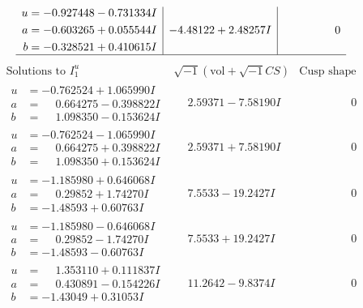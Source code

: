 \documentclass[1p]{elsarticle_modified}
\theoremstyle{definition}
\newcommand{\I}{\sqrt{-1}}
\begin{document}
$$\begin{array}{c|c|c}
\begin{aligned}
u &= -0.927448 - 0.731334 I \\
a &= -0.603265 + 0.055544 I \\
b &= -0.328521 + 0.410615 I\end{aligned}
 & -4.48122 + 2.48257 I & \phantom{-0.000000 } 0\\
 \hline 
 \end{array}$$\newpage$$\begin{array}{c|c|c}  
\text{Solutions to }I^u_{1}& \I (\text{vol} + \sqrt{-1}CS) & \text{Cusp shape}\\
 \hline 
\begin{aligned}
u &= -0.762524 + 1.065990 I \\
a &= \phantom{-}0.664275 - 0.398822 I \\
b &= \phantom{-}1.098350 - 0.153624 I\end{aligned}
 & \phantom{-}2.59371 - 7.58190 I & \phantom{-0.000000 } 0 \\ \hline\begin{aligned}
u &= -0.762524 - 1.065990 I \\
a &= \phantom{-}0.664275 + 0.398822 I \\
b &= \phantom{-}1.098350 + 0.153624 I\end{aligned}
 & \phantom{-}2.59371 + 7.58190 I & \phantom{-0.000000 } 0 \\ \hline\begin{aligned}
u &= -1.185980 + 0.646068 I \\
a &= \phantom{-}0.29852 + 1.74270 I \\
b &= -1.48593 + 0.60763 I\end{aligned}
 & \phantom{-}7.5533 - 19.2427 I & \phantom{-0.000000 } 0 \\ \hline\begin{aligned}
u &= -1.185980 - 0.646068 I \\
a &= \phantom{-}0.29852 - 1.74270 I \\
b &= -1.48593 - 0.60763 I\end{aligned}
 & \phantom{-}7.5533 + 19.2427 I & \phantom{-0.000000 } 0 \\ \hline\begin{aligned}
u &= \phantom{-}1.353110 + 0.111837 I \\
a &= \phantom{-}0.430891 - 0.154226 I \\
b &= -1.43049 + 0.31053 I\end{aligned}
 & \phantom{-}11.2642 - 9.8374 I & \phantom{-0.000000 } 0 \\ \hline\begin{aligned}

\end{aligned}
\end{array}$$
\end{document}

